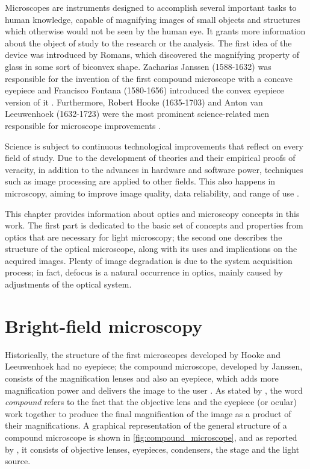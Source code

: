 Microscopes are instruments designed to accomplish several important tasks to human knowledge, capable of magnifying images of small objects and structures which otherwise would not be seen by the human eye. It grants more information about the object of study to the research or the analysis. The first idea of the device was introduced by Romans, which discovered the magnifying property of glass in some sort of biconvex shape. Zacharias Janssen (1588-1632) was responsible for the invention of the first compound microscope with a concave eyepiece and  Francisco Fontana (1580-1656) introduced the convex eyepiece version of it \cite{zilio2009optica}. Furthermore, Robert Hooke (1635-1703) and Anton van Leeuwenhoek (1632-1723) were the most prominent science-related men responsible for microscope improvements \cite{wu2008microscope}.

Science is subject to continuous technological improvements that reflect on every field of study. Due to the development of theories and their empirical proofs of veracity, in addition to the advances in hardware and software power, techniques such as image processing are applied to other fields. This also happens in microscopy, aiming to improve image quality, data reliability, and range of use \cite{boyde1990modern}.

This chapter provides information about optics and microscopy concepts in this work. The first part is dedicated to the basic set of concepts and properties from optics that are necessary for light microscopy; the second one describes the structure of the optical microscope, along with its uses and implications on the acquired images. Plenty of image degradation is due to the system acquisition process; in fact, defocus is a natural occurrence in optics, mainly caused by adjustments of the optical system.

% 
    
\section{Bright-field microscopy}
\label{sec:light_microscopy}

Historically, the structure of the first microscopes developed by Hooke and Leeuwenhoek had no eyepiece; the compound microscope, developed by Janssen, consists of the magnification lenses and also an eyepiece, which adds more magnification power and delivers the image to the user \cite{lawlor2019introduction}. As stated by , the word \emph{compound} refers to the fact that the objective lens and the eyepiece (or ocular) work together to produce the final magnification of the image as a product of their magnifications. A graphical representation of the general structure of a compound microscope is shown in \autoref{fig:compound_microscope}, and as reported by , it consists of objective lenses, eyepieces, condensers, the stage and the light source.

